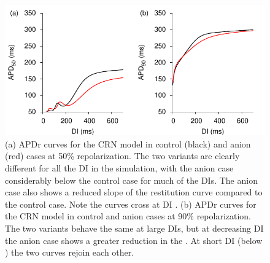 \begin{figure}
\begin{center}
\includegraphics{figures/toolkit/anion/figures/02_APDR}
\end{center}
\caption[Anion Current APD Restitution]{
\label{fig:tookit:anion:apdr}
(a)
APDr curves for the CRN model in control (black) and anion (red) cases at 50\%
repolarization.
The two variants are clearly different for all the DI in the simulation,
with the anion case considerably below the control case for much of the DIs.
The anion case also shows a reduced slope of the restitution curve compared to
the control case.  Note the curves cross at DI .
(b)
APDr curves for the CRN model in control and anion cases at 90\% repolarization.
The two variants behave the same at large DIs, but at decreasing DI the
anion case shows a greater reduction in the \apd[50].
At short DI (below ) the two curves rejoin each other.
}
\end{figure}
